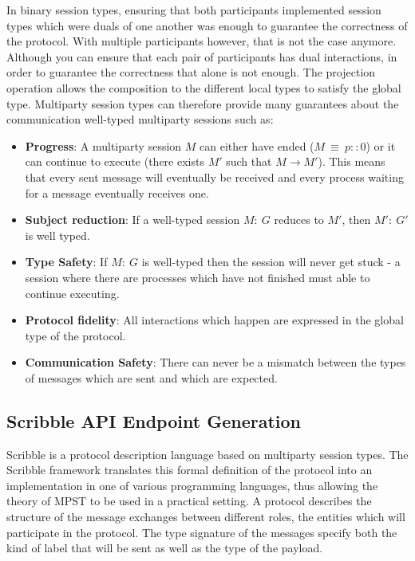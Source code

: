 \documentclass[12pt,twoside]{report}
\begin{document}
In binary session types, ensuring that both participants implemented session types which were duals of one another was enough to guarantee the correctness of the protocol. With multiple participants however, that is not the case anymore. Although you can ensure that each pair of participants has dual interactions, in order to guarantee the correctness that alone is not enough. The projection operation allows the composition to the different local types to satisfy the global type. Multiparty session types can therefore provide many guarantees about the communication well-typed multiparty sessions such as:
\begin{itemize}
    \item \textbf{Progress}: A multiparty session $M$ can either have ended ($M\ \equiv\ p :: 0$) or it can continue to execute (there exists $M'$ such that $M \longrightarrow M'$). This means that every sent message will eventually be received and every process waiting for a message eventually receives one. \cite{verygentleintrotompst, gentleintrotompst}
    \item \textbf{Subject reduction}: If a well-typed session $M:\ G$ reduces to $M'$, then $M':\ G'$ is well typed\cite{verygentleintrotompst}.
    \item \textbf{Type Safety}: If $M:\ G$ is well-typed then the session will never get stuck - a session where there are processes which have not finished must able to continue executing\cite{verygentleintrotompst}.
    \item \textbf{Protocol fidelity}: All interactions which happen are expressed in the global type of the protocol\cite{gentleintrotompst}.
    \item \textbf{Communication Safety}: There can never be a mismatch between the types of messages which are sent and which are expected\cite{gentleintrotompst}.
\end{itemize}{}

\subsection{Scribble API Endpoint Generation}\label{Scribble}
Scribble\cite{scribble,featherweight} is a protocol description language based on multiparty session types. The Scribble framework translates this formal definition of the protocol into an implementation in one of various programming languages, thus allowing the theory of MPST to be used in a practical setting. A protocol describes the structure of the message exchanges between different roles, the entities which will participate in the protocol. The type signature of the messages specify both the kind of label that will be sent as well as the type of the payload.\\
\end{document}

